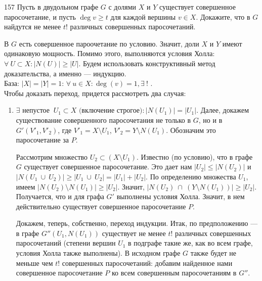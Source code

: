 \begin{task}{157}
Пусть в двудольном графе $G$ с долями $X$ и $Y$ существует совершенное паросочетание, и пусть $\operatorname{deg} v \geq t$ для каждой вершины $v \in X$. Докажите, что в $G$ найдутся не менее $t!$ различных совершенных паросочетаний.
\end{task}

\begin{solution}
В $G$ есть совершенное пароочетание по условию. Значит, доли $X$ и $Y$ имеют одинаковую мощность. Помимо этого, выполняются условия Холла: $\forall \ U \subset X : |N(U)| \geq |U|$. Будем использовать конструктивный метод доказательства, а именно --- индукцию. \\
База: $|X| = |Y| = 1$: $\forall \ u \in X: \operatorname{deg}(v) = 1, \exists \ !$ . \\
Чтобы доказать переход, придется рассмотреть два случая:
\begin{enumerate}
    \item $\exists \text{ непустое } \ U_1 \subset X \text{ (включение строгое)} : |N(U_1)| = |U_1|$. Далее, докажем существование совершенного паросочетания не только в $G$, но и в $G'(V'_1, V'_2)$, где $V'_1 = X \setminus U_1$, $V'_2 = Y \setminus N(U_1)$. Обозначим это паросочетание за $P$. \par
    Рассмотрим множество $U_2 \subset (X \setminus U_1)$. Известно (по условию), что в графе $G$ существует совершенное паросочетание. Это дает нам $|U_2| \leq |N(U_2)|$ и $|N(U_1 \ \cup \ U_2)| \geq |U_1 \ \cup \ U_2| = |U_1| + |U_2|$. По определению множества $U_1$, имеем $|N(U_2) \setminus N(U_1)| \geq |U_2|$. Значит, $|N(U_2) \ \cap \ (Y \setminus N(U_1))| \geq |U_2|$. Получается, что и для графа $G'$ выполнены условия Холла. Значит, в нем действительно существует совершенное паросочетание $P$.\par
    Докажем, теперь, собственно, переход индукции. Итак, по предположению --- в графе $G''(U_1, N(U_1))$ существует не менее $t!$ различных совершенных паросочетаний (степени вершин $U_1$ в подграфе такие же, как во всем графе, условия Холла также выполнены). В исходном графе $G$ также будет не меньше чем $t!$ совершенных паросочетаний: добавим найденное нами совершенное паросочетание $P$ ко всем совершенным паросочетаниям в $G''$.
    

\end{enumerate}
\end{solution}
